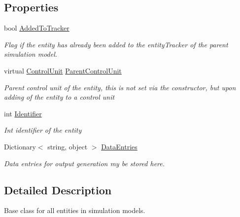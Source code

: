 \subsection*{Properties}
\begin{DoxyCompactItemize}
\item 
bool \hyperlink{class_simulation_core_1_1_h_c_c_m_elements_1_1_entity_ab1a1b5353044b8e2d2abb15adea32932}{Added\+To\+Tracker}
\begin{DoxyCompactList}\small\item\em Flag if the entity has already been added to the entity\+Tracker of the parent simulation model. \end{DoxyCompactList}\item 
virtual \hyperlink{class_simulation_core_1_1_h_c_c_m_elements_1_1_control_unit}{Control\+Unit} \hyperlink{class_simulation_core_1_1_h_c_c_m_elements_1_1_entity_acf748ea5c593457572db419a6680e957}{Parent\+Control\+Unit}
\begin{DoxyCompactList}\small\item\em Parent control unit of the entity, this is not set via the constructor, but upon adding of the entity to a control unit \end{DoxyCompactList}\item 
int \hyperlink{class_simulation_core_1_1_h_c_c_m_elements_1_1_entity_ada14e5bbf7256d84589ec3d170230d7e}{Identifier}
\begin{DoxyCompactList}\small\item\em Int identifier of the entity \end{DoxyCompactList}\item 
Dictionary$<$ string, object $>$ \hyperlink{class_simulation_core_1_1_h_c_c_m_elements_1_1_entity_ab074723c2d7533de8a2a2b135d40b51e}{Data\+Entries}
\begin{DoxyCompactList}\small\item\em Data entries for output generation my be stored here. \end{DoxyCompactList}\end{DoxyCompactItemize}


\subsection{Detailed Description}
Base class for all entities in simulation models. 



